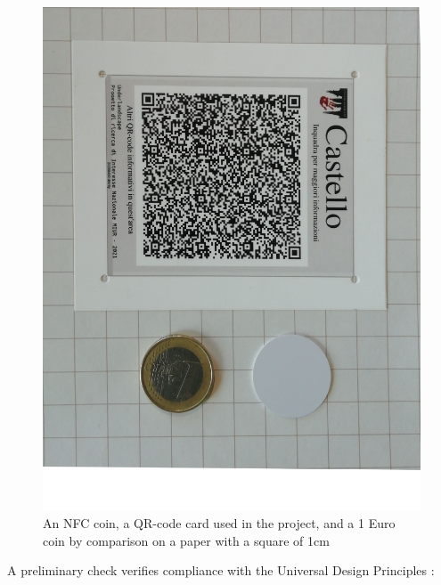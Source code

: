 \documentclass[sustainability,article,submit,pdftex,moreauthors]{Definitions/mdpi}
\begin{document}
\begin{figure}
	\centering
	\includegraphics[width=0.9\linewidth]{figure/qr+NFC+coin}
	\caption[Passive devices dimensions]{An NFC coin, a QR-code card used in the project, and a 1 Euro coin by comparison on a paper with a square of 1cm}
	\label{fig:qrnfccoin}
\end{figure}

A preliminary check verifies compliance with the Universal Design Principles \cite{udi97a}:

\end{document}
